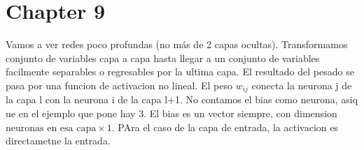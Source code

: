 \chapter{Chapter 9}\label{Chapter9} 

Vamos a ver redes poco profundas (no más de 2 capas ocultas). Transformamos conjunto de variables capa a capa hasta llegar a un conjunto de variables facilmente separables o regresables por la ultima capa. El resultado del pesado se pasa por una funcion de activacion no lineal. El peso $w_{ij}$ conecta la neurona j de la capa l con la neurona i de la capa l+1. No contamos el bias como neurona, asiq ue en el ejemplo que pone hay 3. El bias es un vector siempre, con dimension $\text{neuronas en esa capa} \times 1$. PAra el caso de la capa de entrada, la activacion es directametne la entrada. 